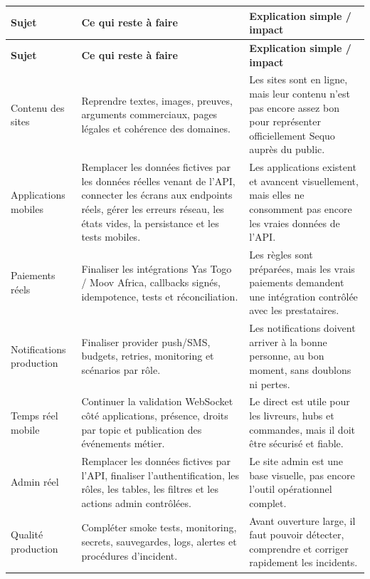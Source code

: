 \documentclass[11pt,letterpaper]{article}
\begin{document}
{\footnotesize
\begin{longtable}{@{}L{3.4cm}L{6.4cm}L{6.4cm}@{}}
\toprule
{}
\textbf{Sujet} & \textbf{Ce qui reste à faire} & \textbf{Explication simple / impact} \\
\midrule
\endfirsthead
\toprule
{}
\textbf{Sujet} & \textbf{Ce qui reste à faire} & \textbf{Explication simple / impact} \\
\midrule
\endhead
Contenu des sites & Reprendre textes, images, preuves, arguments commerciaux, pages légales et cohérence des domaines. & Les sites sont en ligne, mais leur contenu n'est pas encore assez bon pour représenter officiellement Sequo auprès du public. \\
Applications mobiles & Remplacer les données fictives par les données réelles venant de l'API, connecter les écrans aux endpoints réels, gérer les erreurs réseau, les états vides, la persistance et les tests mobiles. & Les applications existent et avancent visuellement, mais elles ne consomment pas encore les vraies données de l'API. \\
Paiements réels & Finaliser les intégrations Yas Togo / Moov Africa, callbacks signés, idempotence, tests et réconciliation. & Les règles sont préparées, mais les vrais paiements demandent une intégration contrôlée avec les prestataires. \\
Notifications production & Finaliser provider push/SMS, budgets, retries, monitoring et scénarios par rôle. & Les notifications doivent arriver à la bonne personne, au bon moment, sans doublons ni pertes. \\
Temps réel mobile & Continuer la validation WebSocket côté applications, présence, droits par topic et publication des événements métier. & Le direct est utile pour les livreurs, hubs et commandes, mais il doit être sécurisé et fiable. \\
Admin réel & Remplacer les données fictives par l'API, finaliser l'authentification, les rôles, les tables, les filtres et les actions admin contrôlées. & Le site admin est une base visuelle, pas encore l'outil opérationnel complet. \\
Qualité production & Compléter smoke tests, monitoring, secrets, sauvegardes, logs, alertes et procédures d'incident. & Avant ouverture large, il faut pouvoir détecter, comprendre et corriger rapidement les incidents. \\
\bottomrule
\end{longtable}
}
\end{document}
